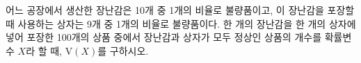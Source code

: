 어느 공장에서 생산한 장난감은 10개 중 1개의 비율로 불량품이고, 이 장난감을 포장할 때 사용하는 상자는 9개 중 1개의 비율로 불량품이다. 한 개의 장난감을 한 개의 상자에 넣어 포장한 100개의 상품 중에서 장난감과 상자가 모두 정상인 상품의 개수를 확률변수 $X$라 할 때, $\mathrm{V}(X)$를 구하시오.
